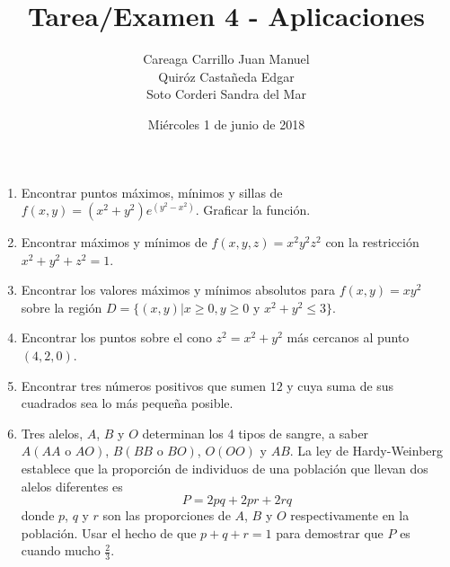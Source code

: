 \documentclass{article}
\begin{document}
        \title{Tarea/Examen 4 - Aplicaciones}
        \author{Careaga Carrillo Juan Manuel
        \\ Quiróz Castañeda Edgar
        \\ Soto Corderi Sandra del Mar}
        \date{Miércoles 1 de junio de 2018}
        \maketitle

        \begin{enumerate}
            \item {
                Encontrar puntos máximos, mínimos y sillas de $f(x,y)=(x^2+y^2)e^{(y^2-x^2)}$.
                Graficar la función.

                \color{azul}
            }
            \item {
                Encontrar máximos y mínimos de $f(x,y,z)=x^2y^2z^2$ con la restricción
                $x^2+y^2+z^2=1$.

                \color{azul}
            }
            \item {
                Encontrar los valores máximos y mínimos absolutos para $f(x,y)=xy^2$ sobre
                la región $D=\{(x,y)|x\geq 0, y\geq 0 \text{ y } x^2+y^2\leq 3\}$.

                \color{azul}
            }
            \item {
                Encontrar los puntos sobre el cono $z^2=x^2+y^2$ más cercanos al punto
                $(4,2,0)$.

                \color{azul}
            }
            \item {
                Encontrar tres números positivos que sumen $12$ y cuya suma de sus cuadrados
                sea lo más pequeña posible.

                \color{azul}
            }
            \item {
                Tres alelos, $A$, $B$ y $O$ determinan los 4 tipos de sangre, a saber
                $A(AA \text{ o } AO)$, $B(BB \text{ o } BO)$, $O(OO)$ y $AB$. La ley
                de Hardy-Weinberg establece que la proporción de individuos de una
                población que llevan dos alelos diferentes es
                \[ P=2pq+2pr+2rq \]
                donde $p$, $q$ y $r$ son las proporciones de $A$, $B$ y $O$ respectivamente
                en la población. Usar el hecho de que $p+q+r=1$ para demostrar que $P$
                es cuando mucho $\frac{2}{3}$.

}
\end{enumerate}
\end{document}

